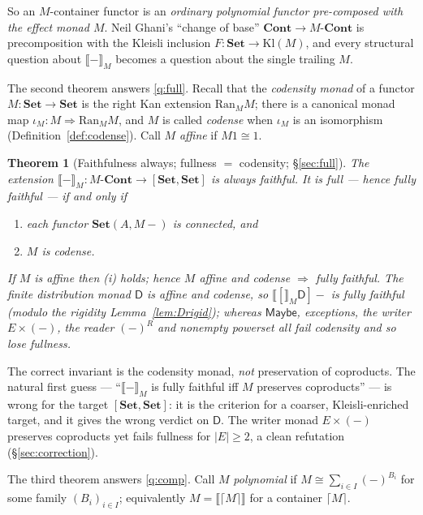 \documentclass[11pt]{amsart}
\theoremstyle{plain}
\newtheorem{theorem}{Theorem}[section]
\theoremstyle{definition}
\newcommand{\Set}{\mathbf{Set}}
\newcommand{\Cont}{\mathbf{Cont}}
\newcommand{\Kl}{\mathrm{Kl}}
\newcommand{\Ran}{\mathrm{Ran}}
\newcommand{\ext}[1]{\llbracket #1 \rrbracket}
\newcommand{\extM}[1]{\llbracket #1 \rrbracket_{M}}
\newcommand{\ceil}[1]{\lceil #1 \rceil}
\newcommand{\D}{\mathsf{D}}
\newcommand{\Maybe}{\mathsf{Maybe}}
\begin{document}
So an $M$-container functor is an \emph{ordinary polynomial functor pre-composed with the effect
monad $M$}. Neil Ghani's ``change of base'' $\Cont\to M\text{-}\Cont$ is precomposition with the
Kleisli inclusion $F\colon\Set\to\Kl(M)$, and every structural question about $\extM{-}$ becomes a
question about the single trailing $M$.

The second theorem answers \ref{q:full}. Recall that the \emph{codensity monad} of a functor
$M\colon\Set\to\Set$ is the right Kan extension $\Ran_M M$; there is a canonical monad map
$\iota_M\colon M\Rightarrow\Ran_M M$, and $M$ is called \emph{codense} when $\iota_M$ is an
isomorphism (Definition~\ref{def:codense}). Call $M$ \emph{affine} if $M1\cong 1$.

\begin{theorem}[Faithfulness always; fullness $=$ codensity; \S\ref{sec:full}]\label{thm:2}
The extension $\extM{-}\colon M\text{-}\Cont\to[\Set,\Set]$ is \emph{always faithful}. It is
\emph{full} --- hence fully faithful --- if and only if
\begin{enumerate}[label=\textup{(\roman*)}]
\item each functor $\Set(A,M{-})$ is connected, and
\item $M$ is codense.
\end{enumerate}
If $M$ is affine then \textup{(i)} holds; hence \emph{$M$ affine and codense $\Rightarrow$ fully
faithful}. The finite distribution monad $\D$ is affine and codense, so $\extM[\D]{-}$ is fully
faithful \textup{(}modulo the rigidity Lemma~\ref{lem:Drigid}\textup{)}; whereas $\Maybe$,
exceptions, the writer $E\times(-)$, the reader $(-)^R$ and nonempty powerset all fail codensity and
so lose fullness.
\end{theorem}

The correct invariant is the codensity monad, \emph{not} preservation of coproducts. The natural
first guess --- ``$\extM{-}$ is fully faithful iff $M$ preserves coproducts'' --- is wrong for the
target $[\Set,\Set]$: it is the criterion for a coarser, Kleisli-enriched target, and it gives the
wrong verdict on $\D$. The writer monad $E\times(-)$ preserves coproducts yet fails fullness for
$|E|\ge 2$, a clean refutation (\S\ref{sec:correction}).

The third theorem answers \ref{q:comp}. Call $M$ \emph{polynomial} if $M\cong\sum_{i\in I}(-)^{B_i}$
for some family $(B_i)_{i\in I}$; equivalently $M=\ext{\ceil M}$ for a container $\ceil M$.
\end{document}

